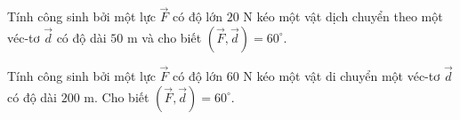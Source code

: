 \begin{bt}%
	Tính công sinh bởi một lực $\overrightarrow{F}$ có độ lớn $20$ N kéo một vật dịch chuyển theo một véc-tơ $\overrightarrow{d}$ có độ dài $50$ m và cho biết $(\overrightarrow{F},\overrightarrow{d})=60^\circ$.
\end{bt}

\begin{bt}%
	Tính công sinh bởi một lực $\overrightarrow{F}$ có độ lớn $60$ N kéo một vật di chuyển một véc-tơ $\overrightarrow{d}$ có độ dài $200$ m. Cho biết $(\overrightarrow{F},\overrightarrow{d})=60^\circ$.
\end{bt}

